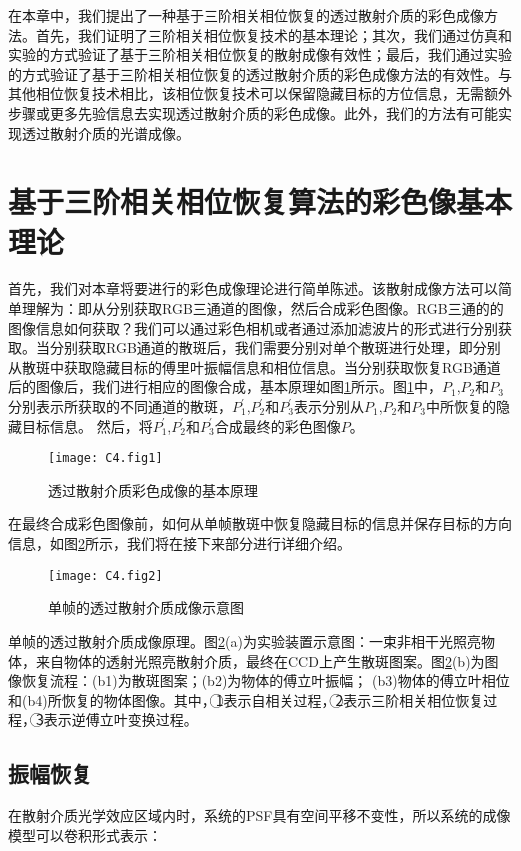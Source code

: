 在本章中，我们提出了一种基于三阶相关相位恢复的透过散射介质的彩色成像方法。首先，我们证明了三阶相关相位恢复技术的基本理论；其次，我们通过仿真和实验的方式验证了基于三阶相关相位恢复的散射成像有效性；最后，我们通过实验的方式验证了基于三阶相关相位恢复的透过散射介质的彩色成像方法的有效性。与其他相位恢复技术相比，该相位恢复技术可以保留隐藏目标的方位信息，无需额外步骤或更多先验信息去实现透过散射介质的彩色成像。此外，我们的方法有可能实现透过散射介质的光谱成像。

\section{基于三阶相关相位恢复算法的彩色像基本理论}

首先，我们对本章将要进行的彩色成像理论进行简单陈述。该散射成像方法可以简单理解为：即从分别获取RGB三通道的图像，然后合成彩色图像。RGB三通的的图像信息如何获取？我们可以通过彩色相机或者通过添加滤波片的形式进行分别获取。当分别获取RGB通道的散斑后，我们需要分别对单个散斑进行处理，即分别从散斑中获取隐藏目标的傅里叶振幅信息和相位信息。当分别获取恢复RGB通道后的图像后，我们进行相应的图像合成，基本原理如图\ref{fig:4.1}所示。图\ref{fig:4.1}中，$P_1$,$P_2$和$P_3$分别表示所获取的不同通道的散斑，$P_1^{\prime}$,$P_2^{\prime}$和$P_3^{\prime}$表示分别从$P_1$,$P_2$和$P_3$中所恢复的隐藏目标信息。
然后，将$P_1^{\prime}$,$P_2^{\prime}$和$P_3^{\prime}$合成最终的彩色图像$P$。

\begin{figure}[htp]
	\centering
	\texttt{[image: C4.fig1]}
	\caption{透过散射介质彩色成像的基本原理}
	\label{fig:4.1}
\end{figure}
在最终合成彩色图像前，如何从单帧散斑中恢复隐藏目标的信息并保存目标的方向信息，如图\ref{fig:4.2}所示，我们将在接下来部分进行详细介绍。
\begin{figure}[htp]
	\centering
	\texttt{[image: C4.fig2]}
	\caption{单帧的透过散射介质成像示意图}
	\label{fig:4.2}
\end{figure}
单帧的透过散射介质成像原理。图\ref{fig:4.2}(a)为实验装置示意图：一束非相干光照亮物体，来自物体的透射光照亮散射介质，最终在CCD上产生散斑图案。图\ref{fig:4.2}(b)为图像恢复流程：(b1)为散斑图案；(b2)为物体的傅立叶振幅； (b3)物体的傅立叶相位和(b4)所恢复的物体图像。其中，{\large \textcircled{\normalsize 1}}表示自相关过程，{\large \textcircled{\normalsize 2}}表示三阶相关相位恢复过程，{\large \textcircled{\normalsize 3}}表示逆傅立叶变换过程。

\subsection{振幅恢复}
在散射介质光学效应区域内时，系统的PSF具有空间平移不变性，所以系统的成像模型可以卷积形式表示：

